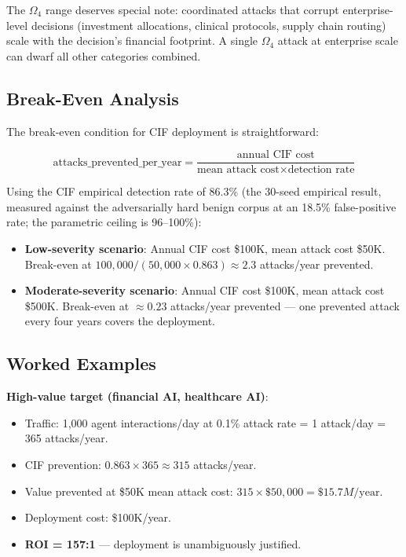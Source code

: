 \documentclass[
]{article}
\providecommand{\tightlist}{%
  \setlength{\itemsep}{0pt}\setlength{\parskip}{0pt}}
\begin{document}
The \(\Omega_4\) range deserves special note: coordinated attacks that
corrupt enterprise-level decisions (investment allocations, clinical
protocols, supply chain routing) scale with the decision's financial
footprint. A single \(\Omega_4\) attack at enterprise scale can dwarf
all other categories combined.

\subsection{Break-Even Analysis}\label{break-even-analysis}

The break-even condition for CIF deployment is straightforward:

\[\text{attacks\_prevented\_per\_year} = \frac{\text{annual CIF cost}}{\text{mean attack cost} \times \text{detection rate}}\]

Using the CIF empirical detection rate of 86.3\% (the 30-seed empirical
result, measured against the adversarially hard benign corpus at an
18.5\% false-positive rate; the parametric ceiling is 96--100\%):

\begin{itemize}
\tightlist
\item
  \textbf{Low-severity scenario}: Annual CIF cost \$100K, mean attack
  cost \$50K. Break-even at
  \(100{,}000 / (50{,}000 \times 0.863) \approx 2.3\) attacks/year
  prevented.
\item
  \textbf{Moderate-severity scenario}: Annual CIF cost \$100K, mean
  attack cost \$500K. Break-even at \(\approx 0.23\) attacks/year
  prevented --- one prevented attack every four years covers the
  deployment.
\end{itemize}

\subsection{Worked Examples}\label{worked-examples}

\textbf{High-value target (financial AI, healthcare AI)}:

\begin{itemize}
\tightlist
\item
  Traffic: 1,000 agent interactions/day at 0.1\% attack rate = 1
  attack/day = 365 attacks/year.
\item
  CIF prevention: \(0.863 \times 365 \approx 315\) attacks/year.
\item
  Value prevented at \$50K mean attack cost:
  \(315 \times \$50{,}000 = \$15.7M/\text{year}\).
\item
  Deployment cost: \$100K/year.
\item
  \textbf{ROI = 157:1} --- deployment is unambiguously justified.
\end{itemize}
\end{document}
